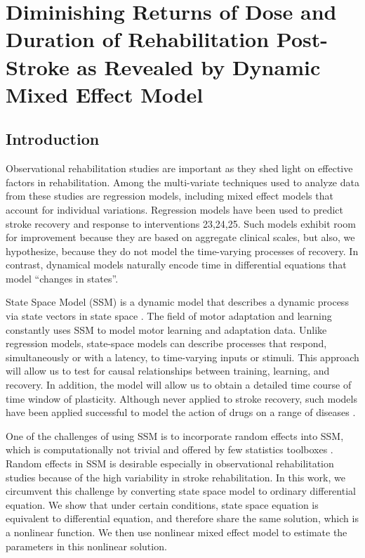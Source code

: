 \chapter{Diminishing Returns of Dose and Duration of Rehabilitation Post-Stroke as Revealed by Dynamic Mixed Effect Model}
\label{cha:dose}


\section{Introduction}
Observational rehabilitation studies are important as they shed light on effective factors in rehabilitation.
Among the multi-variate techniques used to analyze data from these studies are regression models, including mixed effect models that account for individual variations. 
Regression models have been used to predict stroke recovery \cite{19-22} and response to interventions {23,24,25}. 
Such models exhibit room for improvement because they are based on aggregate clinical scales, but also, we hypothesize, because they do not model the time-varying processes of recovery. 
In contrast, dynamical models naturally encode time in differential equations that model “changes in states”. 

State Space Model (SSM) is a dynamic model that describes a dynamic process via state vectors in state space \cite{}.
The field of motor adaptation and learning constantly uses SSM to model motor learning and adaptation data.
Unlike regression models, state-space models can describe processes that respond, simultaneously or with a latency, to time-varying inputs or stimuli.
This approach will allow us to test for causal relationships between training, learning, and recovery. 
In addition, the model will allow us to obtain a detailed time course of time window of plasticity. 
Although never applied to stroke recovery, such models have been applied successful to model the action of drugs on a range of diseases \cite{80,81}. 

One of the challenges of using SSM is to incorporate random effects into SSM, which is computationally not trivial and offered by few statistics toolboxes \cite{}.
Random effects in SSM is desirable especially in observational rehabilitation studies because of the high variability in stroke rehabilitation.
In this work, we circumvent this challenge by converting state space model to ordinary differential equation.
We show that under certain conditions, state space equation is equivalent to differential equation, and therefore share the same solution, which is a nonlinear function.
We then use nonlinear mixed effect model to estimate the parameters in this nonlinear solution.



